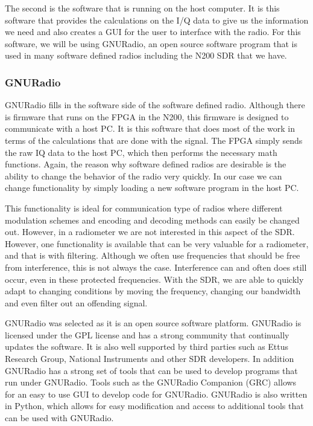 The second is the software that is running on the host computer.  It is this software that provides the calculations on the I/Q data to give us the information we need and also creates a GUI for the user to interface with the radio.  For this software, we will be using GNURadio, an open source software program that is used in many software defined radios including the N200 SDR that we have.

\subsubsection{GNURadio}

GNURadio fills in the software side of the software defined radio.  Although there is firmware that runs on the FPGA in the N200, this firmware is designed to communicate with a host PC.  It is this software that does most of the work in terms of the calculations that are done with the signal.  The FPGA simply sends the raw IQ data to the host PC, which then performs the necessary math functions.  Again, the reason why software defined radios are desirable is the ability to change the behavior of the radio very quickly.  In our case we can change functionality by simply loading a new software program in the host PC.  

This functionality is ideal for communication type of radios where different modulation schemes and encoding and decoding methods can easily be changed out.  However, in a radiometer we are not interested in this aspect of the SDR.  However, one functionality is available that can be very valuable for a radiometer, and that is with filtering.  Although we often use frequencies that should be free from interference, this is not always the case.  Interference can and often does still occur, even in these protected frequencies.  With the SDR, we are able to quickly adapt to changing conditions by moving the frequency, changing our bandwidth and even filter out an offending signal.  

GNURadio was selected as it is an open source software platform.  GNURadio is licensed under the GPL license and has a strong community that continually updates the software.  It is also well supported by third parties such as Ettus Research Group, National Instruments and other SDR developers.  In addition GNURadio has a strong set of tools that can be used to develop programs that run under GNURadio.  Tools such as the GNURadio Companion (GRC) allows for an easy to use GUI to develop code for GNURadio.  GNURadio is also written in Python, which allows for easy modification and access to additional tools that can be used with GNURadio.  

